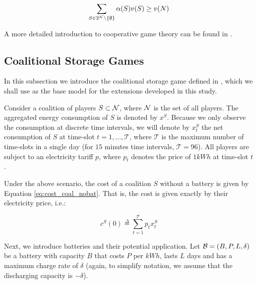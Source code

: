 \begin{equation}
\label{eq:balanced_core}
\sum_{S \in 2^{\N} \setminus \{\emptyset\}} \alpha(S)v(S) \geq v(N)
\end{equation}

A more detailed introduction to cooperative game theory can be found in \cite{rapoport1970n}.

\subsection{Coalitional Storage Games}

In this subsection we introduce the coalitional storage game defined in \cite{kiedanskigames}, which we shall use as the base model for the extensions developed in this study.

Consider a coalition of players $S \subset \mathcal{N}$, where $\mathcal{N}$ is the set of all players.
The aggregated energy consumption of $S$ is denoted by $x^S$. Because we only observe the consumption at discrete time intervals, we will denote by  $x^S_t$ the net consumption of $S$ at time-slot $t = 1, \dots, \mathcal{T}$, where $\mathcal{T}$ is the maximum number of time-slots in a single day (for $15$ minutes time intervals, $\mathcal{T}=96$).
All players are subject to an electricity tariff $p$, where $p_t$ denotes the price of $1 kWh$ at time-slot $t$.

Under the above scenario, the cost of a coalition $S$ without a battery is given by Equation \eqref{eq:cost_coal_nobat}. That is, the cost is given exactly by their electricity price, i.e.:

\begin{equation}
  \label{eq:cost_coal_nobat}
  c^S(0) \overset{\Delta}{=} \sum_{t=1}^{\mathcal{T}} p_t x^S_t
\end{equation}

Next, we introduce batteries and their potential application. Let $\mathcal{B} = (B, P, L, \delta)$ be a battery with capacity $B$ that costs $P$ per $kWh$, lasts $L$ days and has a maximum charge rate of $\delta$ (again, to simplify notation, we assume that the discharging capacity is $-\delta$).

